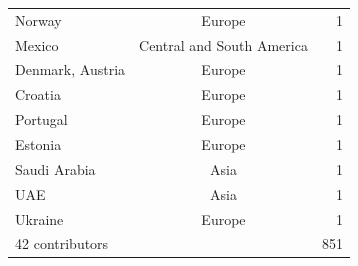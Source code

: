 \documentclass[preprint,5p,times]{elsarticle}
\def\countries{contributors}%
\begin{document}
\begin{table}[htb]
\begin{center}
{\begin{tabular}{l|c|r}
Norway&Europe&1\\%
Mexico&{\small Central and South America}&1\\%
Denmark, Austria&Europe&1\\%
Croatia&Europe&1\\%
Portugal&Europe&1\\%
Estonia&Europe&1\\%
Saudi Arabia&Asia&1\\%
UAE&Asia&1\\%
Ukraine&Europe&1\\%
\hline%
42 \countries & & 851  \\%
\hline%
\end{tabular}%
}%
\end{center}%
\end{table}%
\end{document}
